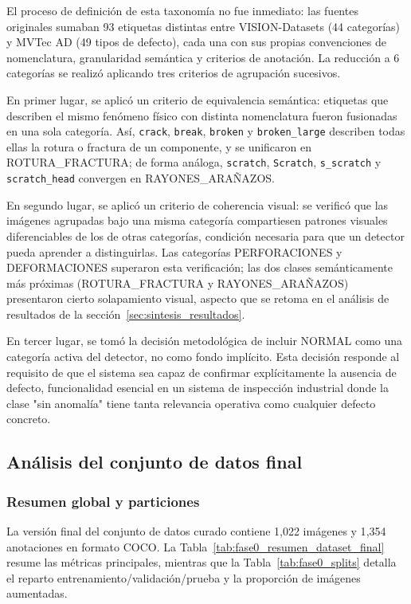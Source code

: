 El proceso de definición de esta taxonomía no fue inmediato: las fuentes originales sumaban 93 etiquetas distintas entre VISION-Datasets (44 categorías) y MVTec AD (49 tipos de defecto), cada una con sus propias convenciones de nomenclatura, granularidad semántica y criterios de anotación. La reducción a 6 categorías se realizó aplicando tres criterios de agrupación sucesivos.

En primer lugar, se aplicó un criterio de equivalencia semántica: etiquetas que describen el mismo fenómeno físico con distinta nomenclatura fueron fusionadas en una sola categoría. Así, \texttt{crack}, \texttt{break}, \texttt{broken} y \texttt{broken\_large} describen todas ellas la rotura o fractura de un componente, y se unificaron en \mbox{ROTURA\_FRACTURA}; de forma análoga, \texttt{scratch}, \texttt{Scratch}, \texttt{s\_scratch} y \texttt{scratch\_head} convergen en \mbox{RAYONES\_ARAÑAZOS}.

En segundo lugar, se aplicó un criterio de coherencia visual: se verificó que las imágenes agrupadas bajo una misma categoría compartiesen patrones visuales diferenciables de los de otras categorías, condición necesaria para que un detector pueda aprender a distinguirlas. Las categorías PERFORACIONES y DEFORMACIONES superaron esta verificación; las dos clases semánticamente más próximas (\mbox{ROTURA\_FRACTURA} y \mbox{RAYONES\_ARAÑAZOS}) presentaron cierto solapamiento visual, aspecto que se retoma en el análisis de resultados de la sección~\ref{sec:sintesis_resultados}.

En tercer lugar, se tomó la decisión metodológica de incluir NORMAL como una categoría activa del detector, no como fondo implícito. Esta decisión responde al requisito de que el sistema sea capaz de confirmar explícitamente la ausencia de defecto, funcionalidad esencial en un sistema de inspección industrial donde la clase "sin anomalía" tiene tanta relevancia operativa como cualquier defecto concreto.

\subsection{Análisis del conjunto de datos final}

\subsubsection{Resumen global y particiones}

La versión final del conjunto de datos curado contiene 1{,}022 imágenes y 1{,}354 anotaciones en formato COCO. La Tabla~\ref{tab:fase0_resumen_dataset_final} resume las métricas principales, mientras que la Tabla~\ref{tab:fase0_splits} detalla el reparto entrenamiento/validación/prueba y la proporción de imágenes aumentadas.

